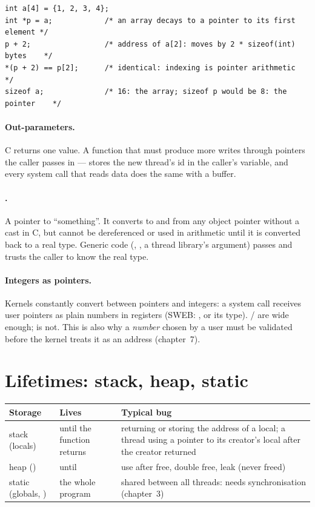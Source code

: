 \begin{lstlisting}
int a[4] = {1, 2, 3, 4};
int *p = a;            /* an array decays to a pointer to its first element */
p + 2;                 /* address of a[2]: moves by 2 * sizeof(int) bytes    */
*(p + 2) == p[2];      /* identical: indexing is pointer arithmetic          */
sizeof a;              /* 16: the array; sizeof p would be 8: the pointer    */
\end{lstlisting}

\paragraph{Out-parameters.} C returns one value. A function that must
produce more writes through pointers the caller passes in ---
 stores the new thread's id in the
caller's variable, and every system call that reads data does the same
with a buffer.

\paragraph{.} A pointer to ``something''. It converts to and
from any object pointer without a cast in C, but cannot be dereferenced
or used in arithmetic until it is converted back to a real type. Generic
code (, , a thread library's argument)
passes  and trusts the caller to know the real type.

\paragraph{Integers as pointers.} Kernels constantly convert between
pointers and integers: a system call receives user pointers as plain
numbers in registers (SWEB: , or its  type).
/ are wide enough;  is not. This
is also why a \emph{number} chosen by a user must be validated before the
kernel treats it as an address (chapter~7).

\section{Lifetimes: stack, heap, static}

\begin{center}
\begin{tabular}{L{2.2cm}L{4.4cm}L{7.2cm}}
\toprule
\textbf{Storage} & \textbf{Lives} & \textbf{Typical bug} \\
\midrule
stack (locals) & until the function returns & returning or storing the
address of a local; a thread using a pointer to its creator's local after
the creator returned \\
heap () & until  & use after free, double free,
leak (never freed) \\
static (globals, ) & the whole program & shared between all
threads: needs synchronisation (chapter~3) \\
\bottomrule
\end{tabular}
\end{center}

